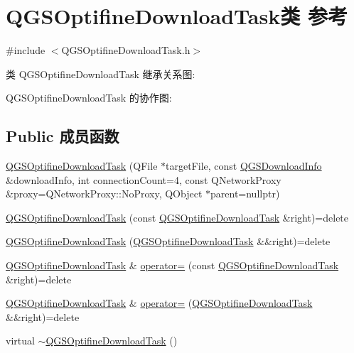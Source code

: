 \hypertarget{class_q_g_s_optifine_download_task}{}\section{Q\+G\+S\+Optifine\+Download\+Task类 参考}
\label{class_q_g_s_optifine_download_task}


{\ttfamily \#include $<$Q\+G\+S\+Optifine\+Download\+Task.\+h$>$}



类 Q\+G\+S\+Optifine\+Download\+Task 继承关系图\+:


Q\+G\+S\+Optifine\+Download\+Task 的协作图\+:
\subsection*{Public 成员函数}
\begin{DoxyCompactItemize}
\item 
\mbox{\hyperlink{class_q_g_s_optifine_download_task_a478a3b073dcbaeb68337485fcd31f060}{Q\+G\+S\+Optifine\+Download\+Task}} (Q\+File $\ast$target\+File, const \mbox{\hyperlink{class_q_g_s_download_info}{Q\+G\+S\+Download\+Info}} \&download\+Info, int connection\+Count=4, const Q\+Network\+Proxy \&proxy=Q\+Network\+Proxy\+::\+No\+Proxy, Q\+Object $\ast$parent=nullptr)
\item 
\mbox{\hyperlink{class_q_g_s_optifine_download_task_a93ffdc0e6ea8473a7a7de4850ed10638}{Q\+G\+S\+Optifine\+Download\+Task}} (const \mbox{\hyperlink{class_q_g_s_optifine_download_task}{Q\+G\+S\+Optifine\+Download\+Task}} \&right)=delete
\item 
\mbox{\hyperlink{class_q_g_s_optifine_download_task_a165b1c2c8ad8bd94a9c13eef5eb8a892}{Q\+G\+S\+Optifine\+Download\+Task}} (\mbox{\hyperlink{class_q_g_s_optifine_download_task}{Q\+G\+S\+Optifine\+Download\+Task}} \&\&right)=delete
\item 
\mbox{\hyperlink{class_q_g_s_optifine_download_task}{Q\+G\+S\+Optifine\+Download\+Task}} \& \mbox{\hyperlink{class_q_g_s_optifine_download_task_afd620a7ed8291f024b5ec66d0bfb3075}{operator=}} (const \mbox{\hyperlink{class_q_g_s_optifine_download_task}{Q\+G\+S\+Optifine\+Download\+Task}} \&right)=delete
\item 
\mbox{\hyperlink{class_q_g_s_optifine_download_task}{Q\+G\+S\+Optifine\+Download\+Task}} \& \mbox{\hyperlink{class_q_g_s_optifine_download_task_a3b50035310577dd35cb2c0d56b283797}{operator=}} (\mbox{\hyperlink{class_q_g_s_optifine_download_task}{Q\+G\+S\+Optifine\+Download\+Task}} \&\&right)=delete
\item 
virtual \mbox{\hyperlink{class_q_g_s_optifine_download_task_a25dbeb46838805db68b6fb35bdfc2a29}{$\sim$\+Q\+G\+S\+Optifine\+Download\+Task}} ()
\end{DoxyCompactItemize}
